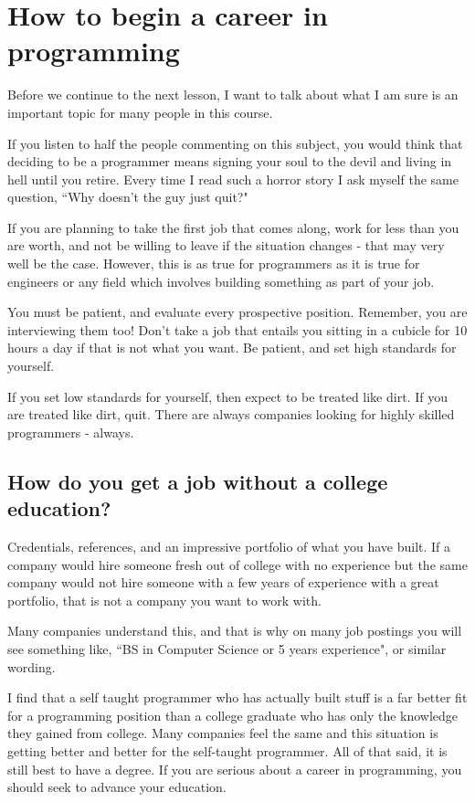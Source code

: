 \documentclass[a4paper,12pt]{article}
\let\stdsection\section
\renewcommand\section{\newpage\stdsection}
\begin{document}
\section{How to begin a career in programming}
Before we continue to the next lesson, I want to talk about what I am sure is an important topic for many people in this course.

If you listen to half the people commenting on this subject, you would think that deciding to be a programmer means signing your soul to the devil and living in hell until you retire. Every time I read such a horror story I ask myself the same question, ``Why doesn't the guy just quit?"

If you are planning to take the first job that comes along, work for less than you are worth, and not be willing to leave if the situation changes - that may very well be the case. However, this is as true for programmers as it is true for engineers or any field which involves building something as part of your job.

You must be patient, and evaluate every prospective position. Remember, you are interviewing them too! Don't take a job that entails you sitting in a cubicle for 10 hours a day if that is not what you want. Be patient, and set high standards for yourself.

If you set low standards for yourself, then expect to be treated like dirt. If you are treated like dirt, quit. There are always companies looking for highly skilled programmers - always.
\subsection{How do you get a job without a college education?}
Credentials, references, and an impressive portfolio of what you have built. If a company would hire someone fresh out of college with no experience but the same company would not hire someone with a few years of experience with a great portfolio, that is not a company you want to work with.

Many companies understand this, and that is why on many job postings you will see something like, ``BS in Computer Science or 5 years experience", or similar wording.

I find that a self taught programmer who has actually built stuff is a far better fit for a programming position than a college graduate who has only the knowledge they gained from college. Many companies feel the same and this situation is getting better and better for the self-taught programmer. All of that said, it is still best to have a degree. If you are serious about a career in programming, you should seek to advance your education.
\end{document}
